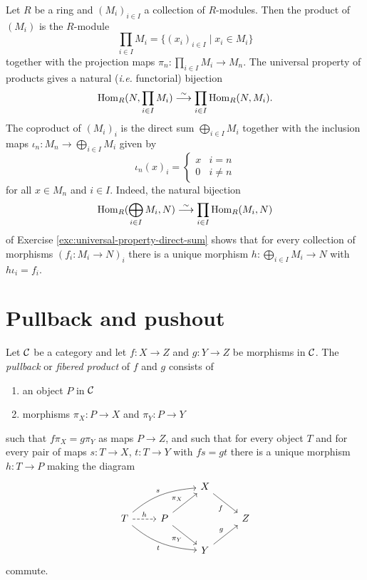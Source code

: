 \begin{example}
Let $R$ be a ring and $(M_i)_{i\in I}$ a collection of $R$-modules. Then the product of $(M_i)$ is the $R$-module
\[
	\prod_{i\in I} M_i = \{ (x_i)_{i\in I} \mid x_i \in M_i \}
\]
together with the projection maps $\pi_n\colon \prod_{i\in I} M_i \to M_n$. 
The universal property of products gives a natural (\emph{i.e.} functorial) bijection
\[
	\operatorname{Hom}_R( N,  \prod_{i\in I} M_i ) \overset{\sim}{\longrightarrow} \prod_{i\in I} \operatorname{Hom}_R(N, M_i ).
\]
The coproduct of $(M_i)_i$ is the direct sum $\bigoplus_{i\in I} M_i$ 
together with the inclusion maps $\iota_n\colon M_n \to \bigoplus_{i\in I} M_i $ given by
\[
	\iota_n(x)_i = \begin{cases} x & i=n \\ 0 & i \neq n \end{cases}
\]
for all $x\in M_n$ and $i\in I$. Indeed, the natural  bijection
\[
	\operatorname{Hom}_R( \bigoplus_{i\in I} M_i, N ) \overset{\sim}{\longrightarrow} \prod_{i\in I} \operatorname{Hom}_R(M_i, N )
\]
of Exercise \ref{exc:universal-property-direct-sum} shows that for every collection of morphisms $(f_i\colon M_i 
\to N)_i$ there is a unique morphism $h\colon  \bigoplus_{i\in I} M_i \to N$ with $h \iota_i = f_i$.
\end{example}



\section{Pullback and pushout}

\begin{definition}
Let ${\mathcal{C}}$ be a category and let  $f\colon X\to Z$ and $g\colon Y\to Z$ be morphisms in ${\mathcal{C}}$. The \emph{pullback} or \emph{fibered product} of $f$ and $g$ consists of 
\begin{enumerate}
\item an object $P$ in ${\mathcal{C}}$
\item morphisms $\pi_X\colon P \to X$ and $\pi_Y\colon P \to Y$
\end{enumerate}
such that $f\pi_X=g\pi_Y$ as maps $P\to Z$, and such that for every object $T$ and for every pair of maps $s\colon T\to X$, $t\colon T\to Y$ with $fs=gt$
there is a unique morphism $h\colon T\to P$ making the diagram
\[
\begin{tikzcd}
& & X \arrow[swap]{rd}{f} \\
T \arrow[out=40,in=185]{rru}{s} \arrow[out=-40,in=175,swap]{rrd}{t} \arrow[dashed]{r}{h}
	& P \arrow{ru}{\pi_X} \arrow[swap]{rd}{\pi_Y} & & Z  \\
& & Y \arrow{ru}{g}
\end{tikzcd}
\]
commute.
\end{definition}

